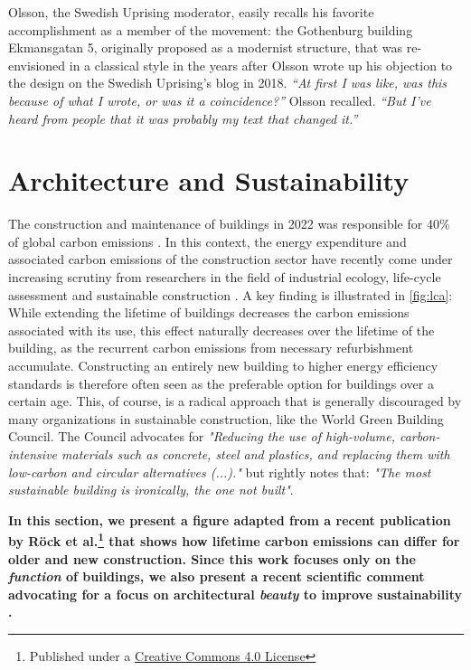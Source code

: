 \documentclass[a4paper]{article}
\begin{document}
Olsson, the Swedish Uprising moderator, easily recalls his favorite accomplishment as a member of the movement: the Gothenburg building Ekmansgatan 5, originally proposed as a modernist structure, that was re-envisioned in a classical style in the years after Olsson wrote up his objection to the design on the Swedish Uprising’s blog in 2018. \textit{“At first I was like, was this because of what I wrote, or was it a coincidence?”} Olsson recalled. \textit{“But I’ve heard from people that it was probably my text that changed it.”}

\clearpage

\section{Architecture and Sustainability}

\begin{mdframed}[linewidth=1pt, roundcorner=5pt, innerleftmargin=10pt, innerrightmargin=10pt, innertopmargin=10pt, innerbottommargin=10pt, linecolor=black, backgroundcolor=white, userdefinedwidth=\textwidth]
    The construction and maintenance of buildings in 2022 was responsible for 40\% of global carbon emissions \cite{camarasa_energy_2023}. In this context, the energy expenditure and associated carbon emissions of the construction sector have recently come under increasing scrutiny from researchers in the field of industrial ecology, life-cycle assessment and sustainable construction \cite{chau_review_2015}\cite{ortiz_sustainability_2009}. A key finding is illustrated in \cref{fig:lca}: While extending the lifetime of buildings decreases the carbon emissions associated with its use, this effect naturally decreases over the lifetime of the building, as the recurrent carbon emissions from necessary refurbishment accumulate. Constructing an entirely new building to higher energy efficiency standards is therefore often seen as the preferable option for buildings over a certain age. This, of course, is a radical approach that is generally discouraged by many organizations in sustainable construction, like the World Green Building Council. The Council advocates for \textit{"Reducing the use of high-volume, carbon-intensive materials such as concrete, steel and plastics, and replacing them with low-carbon and circular alternatives (...)."} \cite[Sec. 7.4]{noauthor_2022_2022} but rightly notes that: \textit{"The most sustainable building is ironically, the one not built"}.
    
    \textbf{In this section, we present a figure adapted from a recent publication by Röck et al.\footnote{Published under a \href{https://creativecommons.org/licenses/by/4.0/}{Creative Commons 4.0 License}} \cite{rock_embodied_2020} that shows how lifetime carbon emissions can differ for older and new construction. Since this work focuses only on the \textit{function} of buildings, we also present a recent scientific comment advocating for a focus on architectural \textit{beauty} to improve sustainability \cite{piotrowski_focusing_2024}.}
\end{mdframed}
\end{document}
